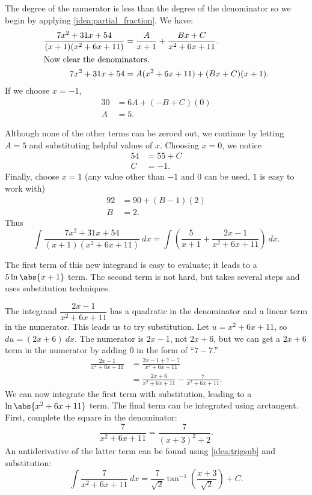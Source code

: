 {The degree of the numerator is less than the degree of the denominator so we begin by applying \autoref{idea:partial_fraction}. We have:
\begin{align*}
\frac{7x^2+31x+54}{(x+1)(x^2+6x+11)} &= \frac{A}{x+1} + \frac{Bx+C}{x^2+6x+11}. \\
\intertext{Now clear the denominators.}
7x^2+31x+54 &= A(x^2+6x+11) + (Bx+C)(x+1).
\end{align*}
If we choose $x=-1$,
\begin{align*}
 30&=6A + (-B+C)(0)\\
 A&= 5.
\end{align*}

Although none of the other terms can be zeroed out, we continue by letting $A=5$ and substituting helpful values of $x$. 
Choosing $x=0$, we notice
\begin{align*}
 54&= 55 +C \\
 C&= -1.
\end{align*}
Finally, choose $x=1$ (any value other than $-1$ and $0$ can be used, $1$ is easy to work with)
\begin{align*}
 92&=90 + (B-1)(2)\\
 B&= 2.
\end{align*}
Thus
\[
 \int\frac{7x^2+31x+54}{(x+1)(x^2+6x+11)}\ dx
 = \int\left(\frac{5}{x+1} + \frac{2x-1}{x^2+6x+11}\right)\ dx.
\]

The first term of this new integrand is easy to evaluate; it leads to a $5\ln\abs{x+1}$ term. The second term is not hard, but takes several steps and uses substitution techniques.

The integrand $\dfrac{2x-1}{x^2+6x+11}$ has a quadratic in the denominator and a linear term in the numerator. This leads us to try substitution. Let $u=x^2+6x+11$, so $du=(2x+6)\ dx$. The numerator is $2x-1$, not $2x+6$, but we can get a $2x+6$ term in the numerator by adding 0 in the form of ``$7-7$.''
\begin{align*}
	\frac{2x-1}{x^2+6x+11} &= \frac{2x-1+7-7}{x^2+6x+11} \\
	&= \frac{2x+6}{x^2+6x+11} - \frac{7}{x^2+6x+11}.
\end{align*}
We can now integrate the first term with substitution, leading to a $\ln\abs{x^2+6x+11}$ term. The final term can be integrated using arctangent. First, complete the square in the denominator:
$$\frac{7}{x^2+6x+11} = \frac{7}{(x+3)^2+2}.$$
An antiderivative of the latter term can be found using \autoref{idea:trigsub} and substitution:
\[
 \int \frac7{x^2+6x+11}\ dx=\frac7{\sqrt2}\tan^{-1}\left(\frac{x+3}{\sqrt2}\right)+C.
\]

}
